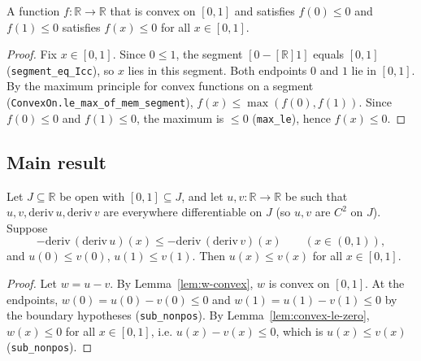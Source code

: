 \begin{lemma}
    \label{lem:convex-le-zero}
    \leanok
    A function $f : \mathbb{R} \to \mathbb{R}$ that is convex on $[0,1]$ and
    satisfies $f(0) \le 0$ and $f(1) \le 0$ satisfies $f(x) \le 0$ for all
    $x \in [0,1]$.
\end{lemma}
\begin{proof}
    Fix $x \in [0,1]$. Since $0 \le 1$, the segment $[0 -[\mathbb{R}] 1]$ equals
    $[0,1]$ (\texttt{segment\_eq\_Icc}), so $x$ lies in this segment. Both
    endpoints $0$ and $1$ lie in $[0,1]$. By the maximum principle for convex
    functions on a segment (\texttt{ConvexOn.le\_max\_of\_mem\_segment}),
    $f(x) \le \max(f(0), f(1))$. Since $f(0) \le 0$ and $f(1) \le 0$, the maximum
    is $\le 0$ (\texttt{max\_le}), hence $f(x) \le 0$.
\end{proof}

\subsection{Main result}

\begin{theorem}
    \label{thm:bvp-comparison}
    \leanok
    Let $J \subseteq \mathbb{R}$ be open with $[0,1] \subseteq J$, and let
    $u, v : \mathbb{R} \to \mathbb{R}$ be such that $u, v, \mathrm{deriv}\,u,
    \mathrm{deriv}\,v$ are everywhere differentiable on $J$ (so $u, v$ are $C^2$
    on $J$). Suppose
    \[
        -\mathrm{deriv}\,(\mathrm{deriv}\,u)(x) \le
        -\mathrm{deriv}\,(\mathrm{deriv}\,v)(x) \qquad (x \in (0,1)),
    \]
    and $u(0) \le v(0)$, $u(1) \le v(1)$. Then $u(x) \le v(x)$ for all
    $x \in [0,1]$.
\end{theorem}
\begin{proof}
    Let $w = u - v$. By Lemma~\ref{lem:w-convex}, $w$ is convex on $[0,1]$. At
    the endpoints, $w(0) = u(0) - v(0) \le 0$ and $w(1) = u(1) - v(1) \le 0$ by
    the boundary hypotheses (\texttt{sub\_nonpos}). By
    Lemma~\ref{lem:convex-le-zero}, $w(x) \le 0$ for all $x \in [0,1]$, i.e.
    $u(x) - v(x) \le 0$, which is $u(x) \le v(x)$ (\texttt{sub\_nonpos}).
\end{proof}


